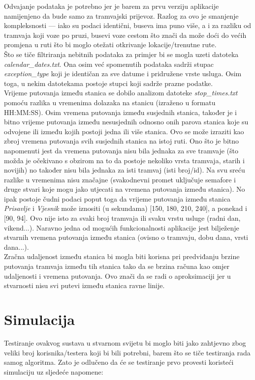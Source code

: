\documentclass[times, utf8, diplomski]{fer}
\begin{document}
Odvajanje podataka je potrebno jer je barem za prvu verziju aplikacije namijenjeno da bude samo za tramvajski prijevoz. Razlog za ovo je smanjenje kompleksnosti --- iako su podaci identični, buseva ima puno više, a i za razliku od tramvaja koji voze po pruzi, busevi voze cestom što znači da može doći do većih promjena u ruti što bi moglo otežati otkrivanje lokacije/trenutne rute.\\
Što se tiče filtriranja nebitnih podataka za primjer bi se mogla uzeti datoteka \emph{calendar\_dates.txt}. Ona osim već spomenutih podataka sadrži stupac \emph{exception\_type} koji je identičan za sve datume i pridružene vrste usluga. Osim toga, u nekim datotekama postoje stupci koji sadrže prazne podatke.\\
Vrijeme putovanja između stanica se dobilo analizom datoteke \emph{stop\_times.txt} pomoću razlika u vremenima dolazaka na stanicu (izraženo u formatu HH:MM:SS). Osim vremena putovanja između susjednih stanica, također je i bitno vrijeme putovanja između nesusjednih odnosno onih parova stanica koje su odvojene ili između kojih postoji jedna ili više stanica. Ovo se može izraziti kao zbroj vremena putovanja svih susjednih stanica na istoj ruti. Ono što je bitno napomenuti jest da vremena putovanja nisu bila jednaka za sve tramvaje (što možda je očekivano s obzirom na to da postoje nekoliko vrsta tramvaja, starih i novijih) no također nisu bila jednaka za isti tramvaj (isti broj/id). Na svu sreću razlike u vremenima nisu značajne (svakodnevni promet uključuje semafore i druge stvari koje mogu jako utjecati na vremena putovanja između stanica). No ipak postoje čudni podaci poput toga da vrijeme putovanja između stanica \emph{Prisavlje} i \emph{Vjesnik} može iznositi (u sekundama) [150, 180, 210, 240], a ponekad i [90, 94]. Ovo nije isto za svaki broj tramvaja ili svaku vrstu usluge (radni dan, vikend...). Naravno jedna od mogućih funkcionalnosti aplikacije jest bilježenje stvarnih vremena putovanja između stanica (ovisno o tramvaju, dobu dana, vrsti dana...).\\
Zračna udaljenost između stanica bi mogla biti korisna pri predviđanju brzine putovanja tramvaja između tih stanica tako da se brzina računa kao omjer udaljenosti i vremena putovanja. Ovo znači da se radi o aproksimaciji jer u stvarnosti nisu svi putevi između stanica ravne linije.


\chapter{Simulacija}
Testiranje ovakvog sustava u stvarnom svijetu bi moglo biti jako zahtjevno zbog veliki broj korisnika/testera koji bi bili potrebni, barem što se tiče testiranja rada samog algoritma. Zato je odlučeno da će se testiranje prvo provesti koristeći simulaciju uz sljedeće napomene:
\end{document}
